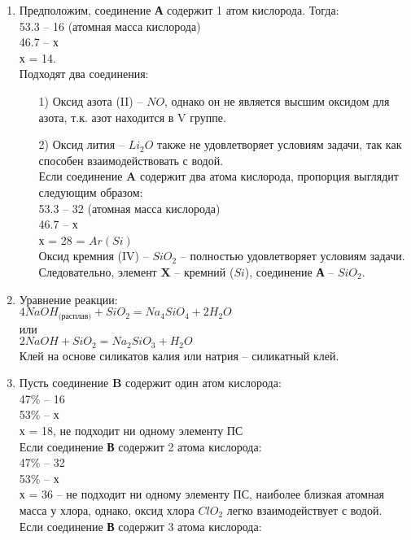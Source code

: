 \solutionSection
\begin{enumerate}
    \item Предположим, соединение \textbf{А} содержит 1 атом кислорода. Тогда:\\
    53.3 – 16 (атомная масса кислорода)\\
    46.7 – х\\
    х = 14.\\
    Подходят два соединения:\begin{enumerate}
    \item[1)]Оксид азота (II) – $NO$, однако он не является высшим оксидом для азота, т.к. азот находится в V группе.
    \item[2)]Оксид лития – $Li_2O$ также не удовлетворяет условиям задачи, так как способен взаимодействовать с водой.\\
    Если соединение \textbf{A} содержит два атома кислорода, пропорция выглядит следующим образом: \\
    53.3 – 32 (атомная масса кислорода)\\
    46.7 – х \\
    х = 28 = $Ar(Si)$\\
    Оксид кремния (IV) – $SiO_2$ – полностью удовлетворяет условиям задачи. Следовательно, элемент \textbf{X} – кремний ($Si$), соединение \textbf{А} – $SiO_2$.
    \end{enumerate}
    \item Уравнение реакции:\\
    $4NaOH_\text{(расплав)} + SiO_2 = Na_4SiO_4 + 2H_2O$\\
    или \\
    $2NaOH + SiO_2 = Na_2SiO_3 + H_2O$\\
    Клей на основе силикатов калия или натрия – силикатный клей.
    \item Пусть соединение \textbf{B} содержит один атом кислорода:\\
    47\% – 16\\
    53\% – х\\
    х = 18, не подходит ни одному элементу ПС\\
    Если соединение \textbf{В} содержит 2 атома кислорода:\\
    47\% – 32\\
    53\% – х\\
    х = 36 – не подходит ни одному элементу ПС, наиболее близкая атомная масса у хлора, однако, оксид хлора $ClO_2$ легко взаимодействует с водой.\\
    Если соединение \textbf{В} содержит 3 атома кислорода:\\

\end{enumerate}
